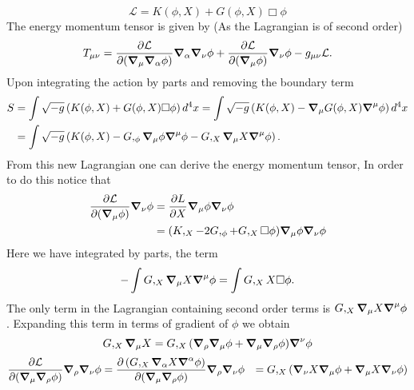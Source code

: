 \documentclass[12pt,a4paper,draft]{article}
\author{}
\begin{document}
\title{}
\maketitle
\begin{equation}
\mathcal{L} = K(\phi,X)+G(\phi,X)\Box \phi
\end{equation}
The energy momentum tensor is given by (As the Lagrangian is of second order)
\begin{equation}
    T_{\mu \nu} = \pdv{\mathcal{L}}{(\grad_{\mu}\grad_{\alpha}\phi)} \grad_{\alpha}\grad_{\nu}\phi + \pdv{\mathcal{L}}{(\grad_{\mu} \phi)} \grad_{\nu} \phi- g_{\mu \nu} \mathcal{L}.
\end{equation}
Upon integrating the action by parts and removing the boundary term 
\begin{equation}
\begin{split}
    S &= \int \sqrt{-g} \left( K(\phi,X)+G(\phi,X)\Box \phi\right) d^4x = \int \sqrt{-g} \left(  K(\phi,X)- \grad_{\mu} G(\phi,X) \grad^{\mu} \phi \right) d^4x \\
    &= \int \sqrt{-g} \left( K(\phi,X)- G,_{\phi} \grad_{\mu} \phi \grad^{\mu} \phi - G,_{X} \grad_{\mu} X \grad^{\mu} \phi \right).
    \end{split}
    \label{eq:action}
\end{equation}
From this new Lagrangian one can derive the energy momentum tensor, In order to  do this notice that
\begin{equation}
    \begin{split}
    \pdv{\mathcal{L}}{(\grad_{\mu} \phi)} \grad_{\nu} \phi &= \pdv{L}{X}  \grad_{\mu} \phi \grad_{\nu} \phi \\
    &= (K,_X- 2 G,_{\phi}+G,_X \Box \phi) \grad_{\mu} \phi \grad_{\nu} \phi
    \end{split}
\end{equation}
Here we have integrated by parts, the term 
\begin{equation}
    -\int   G,_{X} \grad_{\mu} X \grad^{\mu} \phi = \int   G,_{X} X \Box \phi.
\end{equation}
The only term in the Lagrangian containing second order terms is $G,_{X} \grad_{\mu} X \grad^{\mu} \phi$. Expanding this term in terms of gradient of $\phi$ we obtain
\begin{equation}
    G,_{X} \grad_{\mu} X = G,_{X} (\grad_{\rho}\grad_{\mu} \phi+\grad_{\mu}\grad_{\rho} \phi  ) \grad^{\nu} \phi
\end{equation}
\begin{equation}
    \begin{split}
         \pdv{\mathcal{L}}{(\grad_{\mu}\grad_{\rho}\phi)} \grad_{\rho}\grad_{\nu}\phi &=\pdv{\left( G,_{X} \grad_{\alpha} X  \grad^{\alpha}\phi\right)}{(\grad_{\mu}\grad_{\rho}\phi)} \grad_{\rho}\grad_{\nu}\phi
         &=  G,_{X} (\grad_{\nu} X \grad_{\mu} \phi+\grad_{\mu}X \grad_{\nu} \phi )
    \end{split}
\end{equation}
\end{document}
